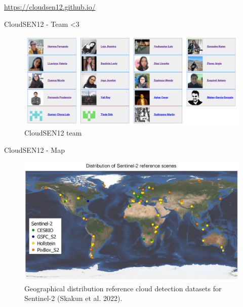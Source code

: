\begin{frame}
	\begin{center}
		\begin{figure}
		\end{figure}
		\textcolor{blue}{\href{https://cloudsen12.github.io/}{https://cloudsen12.github.io/}}
	\end{center}
\end{frame}


\begin{frame}{CloudSEN12 - Team <3}
	\begin{center}
		\begin{figure}
			\centering
			\includegraphics[width=1.0\linewidth]{images/dataset_team.png}
			{\caption*{CloudSEN12 team}}
			\label{fig:introfig01}
		\end{figure}
	\end{center}
\end{frame}


\begin{frame}{CloudSEN12 - Map}
	\begin{center}
		\begin{figure}
			\centering
			\includegraphics[width=0.85\linewidth]{images/intro_fig01.png}
			\caption[fig:introfig01]{Geographical distribution reference cloud detection datasets for Sentinel-2 (Skakun et al. 2022).}
			\label{fig:introfig01}
		\end{figure}
	\end{center}
\end{frame}

